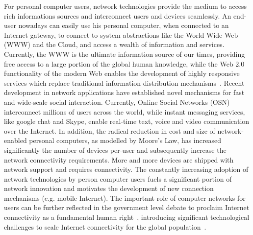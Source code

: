 For personal computer users, network technologies provide the medium to access
rich informations sources and interconnect users and devices seamlessly. An
end-user nowadays can easily use his personal computer, when connected to an
Internet gateway, to connect to system abstractions like the World Wide Web
(WWW) and the Cloud, and access a wealth of information and services.
Currently, the WWW is the ultimate information source of our times, providing
free access to a large portion of the global human knowledge, while the Web 2.0
functionality of the modern Web enables the development of highly responsive
services which replace traditional information distribution
mechanisms~\cite{stempel2000}.  Recent development in network applications have
established novel mechanisms for fast and wide-scale social interaction.
Currently, Online Social Networks (OSN) interconnect millions of users across
the world, while instant messaging services, like google chat and Skype, enable
real-time text, voice and video communication over the Internet.  In addition,
the radical reduction in cost and size of network-enabled personal computers, as
modelled by Moore's Law, has increased significantly the number of devices
per-user and subsequently increase the network connectivity requirements.  More
and more devices are shipped with network support and requires connectivity. The
constantly increasing adoption of network technologies by person computer users
fuels a significant portion of network innovation and motivates the development
of new connection mechanisms (e.g.  mobile Internet).  The important role of
computer networks for users can be further reflected in the government level
debate to proclaim Internet connectivity as a fundamental human
right~\cite{klang2005human, Wicker2013}, introducing significant technological
challenges to scale Internet connectivity for the global
population~\cite{cerf2012}.



